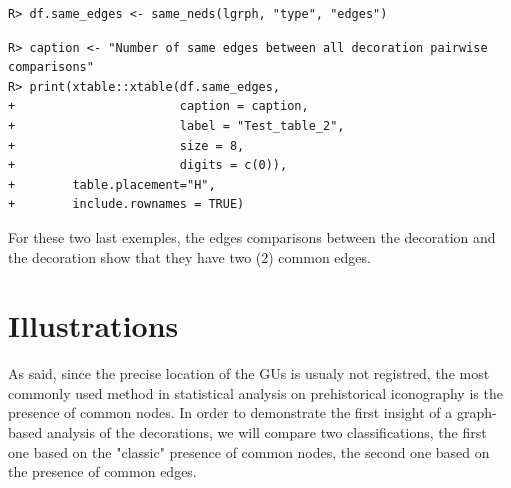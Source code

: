 \documentclass[article]{jss}\usepackage{knitr}
\begin{document}
\begin{kframe}
\begin{verbatim}
R> df.same_edges <- same_neds(lgrph, "type", "edges")
\end{verbatim}


{\ttfamily\noindent\bfseries{}}\begin{verbatim}
R> caption <- "Number of same edges between all decoration pairwise comparisons"
R> print(xtable::xtable(df.same_edges,
+                       caption = caption,
+                       label = "Test_table_2",
+                       size = 8,
+                       digits = c(0)),
+        table.placement="H",
+        include.rownames = TRUE)
\end{verbatim}


{\ttfamily\noindent\bfseries{}}\end{kframe}

For these two last exemples, the edges comparisons between the decoration  and the decoration  show that they have two (2) common edges.

\section{Illustrations} \label{sec:illustrations}

As said, since the precise location of the GUs is usualy not registred, the most commonly used method in statistical analysis on prehistorical iconography is the presence of common nodes. In order to demonstrate the first insight of a graph-based analysis of the decorations, we will compare two classifications, the first one based on the "classic" presence of common nodes, the second one based on the presence of common edges.
\end{document}
